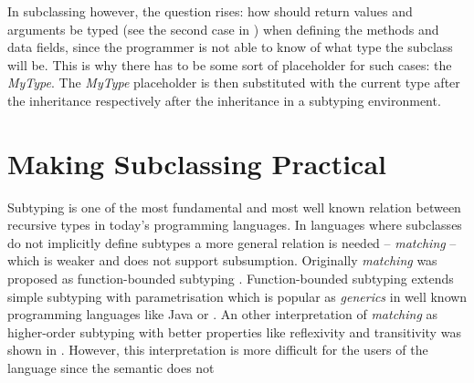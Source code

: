 In subclassing however, the question rises: how should return values and
arguments be typed (see the second case in )
when defining the methods and data fields, since the programmer is not able to
know of what type the subclass will be. This is why there has to be some
sort of placeholder for such cases: the \emph{MyType}. The \emph{MyType}
placeholder is then substituted with the current type after the
inheritance respectively after the inheritance in a subtyping environment.

\section{Making Subclassing Practical}
\label{ctr:makingSubclassingPractical}
Subtyping is one of the most fundamental and most well known relation
between recursive types in today's programming languages. In languages
where subclasses do not implicitly define subtypes a more general
relation is needed -- \emph{matching} -- which is weaker and does
not support subsumption. Originally \emph{matching} was proposed
as function-bounded subtyping \cite{canning_f-bounded_1989}. Function-bounded
subtyping extends simple subtyping with parametrisation which is popular as
\emph{generics} in well known programming languages like Java or \cs
\cite{barron-estrada_inheritance_2003}. An other interpretation of
\emph{matching} as higher-order subtyping with better properties like
reflexivity and transitivity was shown in \cite{abadi_subtyping_1996}. However,
this interpretation is more difficult for the users of the language since
the semantic does not 

